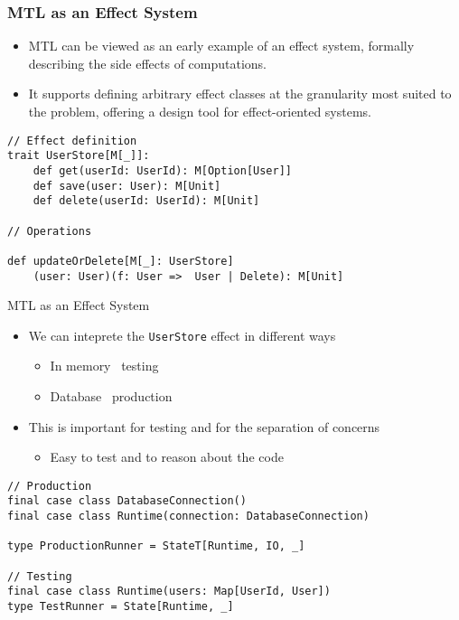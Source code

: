 \documentclass[presentation, 10pt]{beamer}\mode<presentation>{\usetheme{AMSBolognaFC}}
\begin{document}
\begin{frame}[fragile]
	\frametitle{MTL as an Effect System}
	
	\begin{itemize}
		\item MTL can be viewed as an early example of an effect system, formally describing the side effects of computations.
		\item It supports defining arbitrary effect classes at the granularity most suited to the problem, offering a design tool for effect-oriented systems.
	\end{itemize}
\begin{tcolorbox}
\begin{verbatim}
// Effect definition
trait UserStore[M[_]]:
	def get(userId: UserId): M[Option[User]]
	def save(user: User): M[Unit]
	def delete(userId: UserId): M[Unit]

// Operations

def updateOrDelete[M[_]: UserStore]
 	(user: User)(f: User =>  User | Delete): M[Unit]

\end{verbatim}
\end{tcolorbox}
\end{frame}
\begin{frame}[fragile]{MTL as an Effect System}
	\begin{itemize}
		\item We can inteprete the \texttt{UserStore} effect in different ways
		\begin{itemize}
			\item In memory \faArrowRight \, testing
			\item Database \faArrowRight \, production
		\end{itemize}
		\item This is important for testing and for the separation of concerns
		\begin{itemize}
			\item Easy to test and to reason about the code
		\end{itemize}
	\end{itemize}
\begin{tcolorbox}
\begin{verbatim}
// Production
final case class DatabaseConnection()
final case class Runtime(connection: DatabaseConnection)

type ProductionRunner = StateT[Runtime, IO, _]

// Testing
final case class Runtime(users: Map[UserId, User])
type TestRunner = State[Runtime, _]
\end{verbatim}
\end{tcolorbox}
\end{frame}
\end{document}
